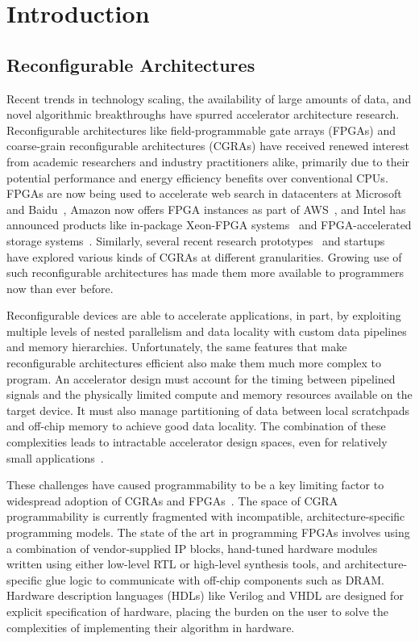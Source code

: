 \chapter{Introduction}
\label{intro}

\section{Reconfigurable Architectures}
Recent trends in technology scaling, the availability of large amounts of data, and novel algorithmic breakthroughs
have spurred accelerator architecture research. Reconfigurable architectures like field-programmable gate arrays (FPGAs)
and coarse-grain reconfigurable architectures (CGRAs)
have received renewed interest from academic researchers and industry practitioners alike,
primarily due to their potential performance and energy efficiency benefits over conventional CPUs.
FPGAs are now being used to accelerate web search
in datacenters at Microsoft and Baidu~\cite{catapult, baidu},
Amazon now offers FPGA instances as part of AWS~\cite{awsf1},
and Intel has announced products like in-package Xeon-FPGA systems~\cite{harp}
and FPGA-accelerated storage systems~\cite{nand_flash}.
Similarly, several recent research prototypes~\cite{dyser, ti, scaledeep, scnn, plasticine}
and startups~\cite{wavecomp, nervana} have explored various
kinds of CGRAs at different granularities.
Growing use of such reconfigurable architectures has made them more available to programmers now than ever before.

Reconfigurable devices are able to accelerate applications, in part, by exploiting multiple
levels of nested parallelism and data locality with custom data pipelines and memory hierarchies.
Unfortunately, the same features that make reconfigurable architectures efficient
also make them much more complex to program. An accelerator design must account for the timing between pipelined signals and
the physically limited compute and memory resources available on the target device.
It must also manage partitioning of data between local scratchpads and off-chip memory to achieve good data locality.
The combination of these complexities leads to intractable accelerator design spaces, even for relatively small applications~\cite{cascaval}.

These challenges have caused programmability to be a key limiting factor to widespread adoption of CGRAs and FPGAs~\cite{fpgaMasses,DeSutter2013}.
The space of CGRA programmability is currently fragmented with incompatible, architecture-specific programming models.
The state of the art in programming FPGAs involves using a combination of vendor-supplied IP blocks,
hand-tuned hardware modules written using either low-level RTL or high-level synthesis tools,
and architecture-specific glue logic to communicate with off-chip components such as DRAM.
Hardware description languages (HDLs) like Verilog and VHDL are designed for explicit specification of hardware,
placing the burden on the user to solve the complexities of implementing their algorithm in hardware.

